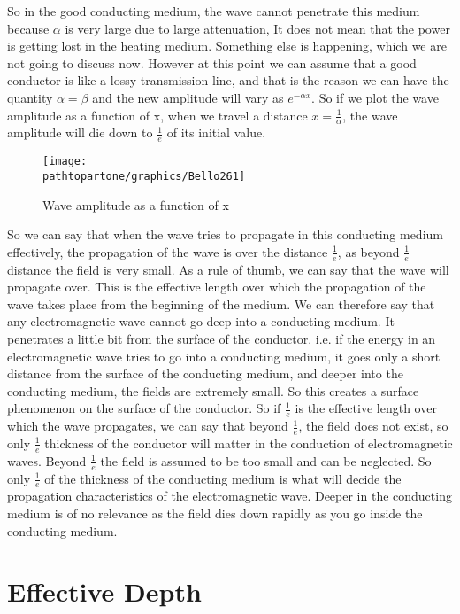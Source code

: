 So in the good conducting medium, the wave cannot penetrate this medium because $\alpha$ is very large due to large attenuation, It does not mean that the power is getting lost in the heating medium. Something else is happening, which we are not going to discuss now. However at this point we can assume that a good conductor is like a lossy transmission line, and that is the reason we can have the quantity $\alpha=\beta$ and the new amplitude will vary as $e^{-\alpha x}$. So if we plot the wave amplitude as a function of x, when we travel a distance $x=\frac{1}{\alpha}$, the wave amplitude will die down to $\frac{1}{e}$ of its initial value.
\begin{figure}[h]
\centering
\texttt{[image: \\pathtopartone/graphics/Bello261]}
\caption{Wave amplitude as a function of x}
\label{fig:bello261}
\end{figure}

So we can say that when the wave tries to propagate in this conducting medium effectively, the propagation of the wave is over the distance $\frac{1}{e}$, as beyond $\frac{1}{e}$ distance the field is very small. As a rule of thumb, we can say that the wave will propagate over. This is the effective length over which the propagation of the wave takes place from the beginning of the medium. We can therefore say that any electromagnetic wave cannot go deep into a conducting medium. It penetrates a little bit from the surface of the conductor. i.e. if the energy in an electromagnetic wave tries to go into a conducting medium, it goes only a short distance from the surface of the conducting medium, and deeper into the conducting medium, the fields are extremely small. So this creates a surface phenomenon on the surface of the conductor. So if $\frac{1}{e}$  is the effective length over which the wave propagates, we can say that beyond $\frac{1}{e}$, the field does not exist, so only $\frac{1}{e}$ thickness of the conductor will matter in the conduction of electromagnetic waves. Beyond $\frac{1}{e}$  the field is assumed to be too small and can be neglected. So only $\frac{1}{e}$ of the thickness of the conducting medium is what will decide the propagation characteristics of the electromagnetic wave. Deeper in the conducting medium is of no relevance as the field dies down rapidly as you go inside the conducting medium.

\section{\textbf{Effective Depth}}

